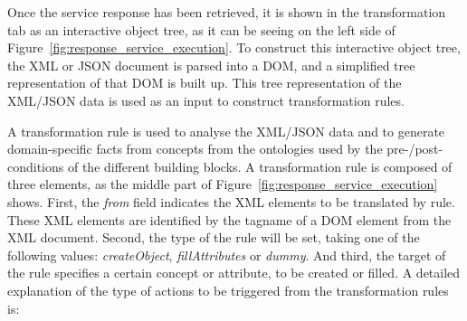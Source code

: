 \documentclass{fast_latex}
\begin{document}
Once the service response has been retrieved, it is shown in the transformation tab as an interactive object tree, as it can be seeing on the left side of Figure~\ref{fig:response_service_execution}. To construct this interactive object tree, the XML or JSON document is parsed into a DOM, and a simplified tree representation of that DOM is built up. This tree representation of the XML/JSON data is used as an input to construct transformation rules.

A transformation rule is used to analyse the XML/JSON data and to generate domain-specific facts from concepts from the ontologies used by the pre-/post-conditions of the different building blocks. A transformation rule is composed of three elements, as the middle part of Figure~\ref{fig:response_service_execution} shows. First, the \textit{from} field indicates the XML elements to be translated by rule. These XML elements are identified by the tagname of a DOM element from the XML document. Second, the type of the rule will be set, taking one of the following values: \emph{createObject}, \emph{fillAttributes} or \emph{dummy}. And third, the target of the rule specifies a certain concept or attribute, to be created or filled. A detailed explanation of the type of actions to be triggered from the transformation rules is:
\end{document}
